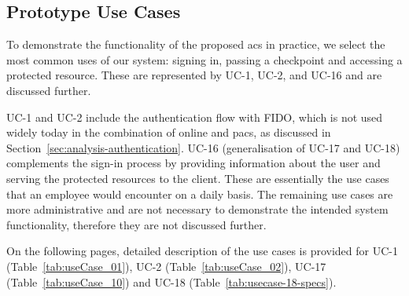 \subsection{Prototype Use Cases} \label{sec:design-prototype-usecases}
To demonstrate the functionality of the proposed \acrshort{acs} in practice, we select the most common uses of our system: signing in, passing a checkpoint and accessing a protected resource. These are represented by UC-1, UC-2, and UC-16 and are discussed further.  

UC-1 and UC-2 include the authentication flow with FIDO, which is not used widely today in the combination of online and \acrshort{pacs}, as discussed in Section~\ref{sec:analysis-authentication}. UC-16 (generalisation of UC-17 and UC-18) complements the sign-in process by providing information about the user and serving the protected resources to the client. These are essentially the use cases that an employee would encounter on a daily basis. The remaining use cases are more administrative and are not necessary to demonstrate the intended system functionality, therefore they are not discussed further.


On the following pages, detailed description of the use cases is provided for UC-1 (Table~\ref{tab:useCase_01}), UC-2 (Table~\ref{tab:useCase_02}), UC-17 (Table~\ref{tab:useCase_10}) and UC-18 (Table~\ref{tab:usecase-18-specs}).


\restoregeometry